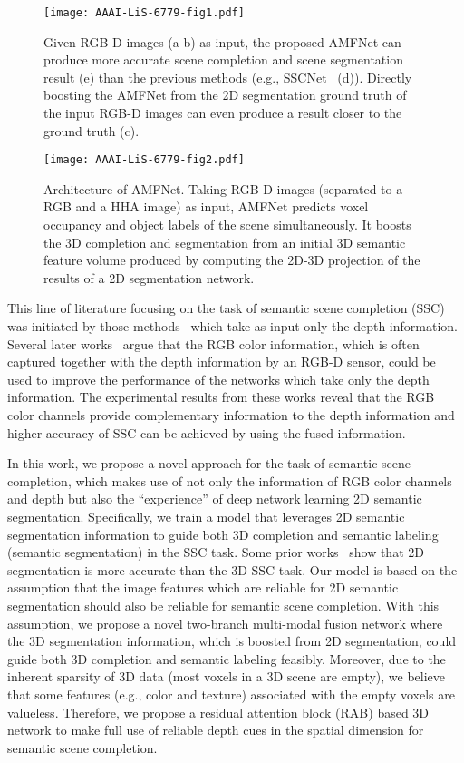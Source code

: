 \documentclass[letterpaper]{article} \usepackage{aaai20}  \usepackage{times}  \usepackage{helvet} \usepackage{courier}  \usepackage[hyphens]{url}  \usepackage{graphicx} \urlstyle{rm} \def\UrlFont{\rm}  \usepackage{graphicx}  \frenchspacing  \setlength{\pdfpagewidth}{8.5in}  \setlength{\pdfpageheight}{11in}
\begin{document}
\begin{figure}[t]
\centering
\texttt{[image: AAAI-LiS-6779-fig1.pdf]}
\caption{Given RGB-D images (a-b) as input, the proposed AMFNet can produce more accurate scene completion and scene segmentation result (e) than the previous methods (e.g., SSCNet~\cite{Song2016SemanticSC} (d)). Directly boosting the AMFNet from the 2D segmentation ground truth of the input RGB-D images can even produce a result closer to the ground truth (c). }
\label{fig1}
\end{figure}

\begin{figure*}[t]
\centering
\texttt{[image: AAAI-LiS-6779-fig2.pdf]}
\caption{Architecture of AMFNet. Taking RGB-D images (separated to a RGB and a HHA image) as input, {AMFNet predicts voxel occupancy and object labels of the scene simultaneously.} It boosts the 3D completion and segmentation from an initial 3D semantic feature volume produced by computing the 2D-3D projection of the results of a 2D segmentation network. } 
\label{network_structure}
\end{figure*}



This line of literature focusing on the task of semantic scene completion (SSC) was initiated by those methods~\cite{Song2016SemanticSC,Zhang2018EfficientSS} which take as input only the depth information. Several later works~\cite{Liu2018SeeAT,Li2019RGBDBD,Hilton2018} argue that the RGB color information, which is often captured together with the depth information by an RGB-D sensor, could be used to improve the performance of the networks which take only the depth information. The experimental results from these works reveal that the RGB color channels provide complementary information to the depth information and higher accuracy of SSC can be achieved by using the fused information.

In this work, we propose a novel approach for the task of semantic scene completion, which makes use of not only the information of RGB color channels and depth but also the “experience” of deep network learning 2D semantic segmentation. Specifically, we train a model that leverages 2D semantic segmentation information to guide both 3D completion and semantic labeling (semantic segmentation) in the SSC task. Some prior works~\cite{Chen2018EncoderDecoderWA,yang2018denseaspp,li2019dfanet,xiong2019upsnet} show that 2D segmentation is more accurate than the 3D SSC task. Our model is based on the assumption that the image features which are reliable for 2D semantic segmentation should also be reliable for semantic scene completion. With this assumption, we propose a novel two-branch multi-modal fusion network where the 3D segmentation information, which is boosted from 2D segmentation, could guide both 3D completion and semantic labeling feasibly. Moreover, due to the inherent sparsity of 3D data (most voxels in a 3D scene are empty), we believe that some features (e.g., color and texture) associated with the empty voxels are valueless. Therefore, we propose a residual attention block (RAB) based 3D network to make full use of reliable depth cues in the spatial dimension for semantic scene completion.
\end{document}
